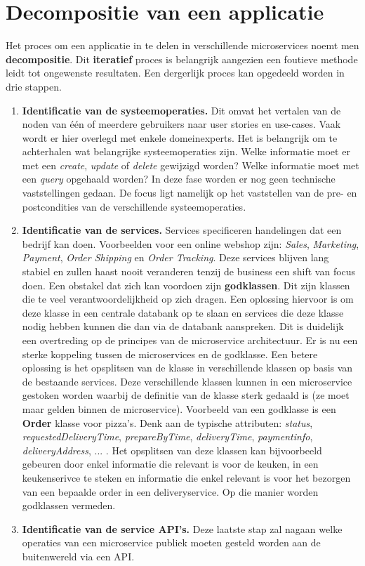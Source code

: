 \documentclass{report}
\begin{document}
	\chapter{Decompositie van een applicatie}
	Het proces om een applicatie in te delen in verschillende microservices noemt men \textbf{decompositie}. Dit \textbf{iteratief} proces is belangrijk aangezien een foutieve methode leidt tot ongewenste resultaten. Een dergerlijk proces kan opgedeeld worden in drie stappen.
	\begin{enumerate}
		\item \textbf{Identificatie van de systeemoperaties.} Dit omvat het vertalen van de noden van één of meerdere gebruikers naar user stories en use-cases. Vaak wordt er hier overlegd met enkele domeinexperts. Het is belangrijk om te achterhalen wat belangrijke systeemoperaties zijn. Welke informatie moet er met een \textit{create}, \textit{update} of \textit{delete} gewijzigd worden? Welke informatie moet met een \textit{query} opgehaald worden? In deze fase worden er nog geen technische vaststellingen gedaan. De focus ligt namelijk op het vaststellen van de pre- en postcondities van de verschillende systeemoperaties.
		
		\item \textbf{Identificatie van de services.} Services specificeren handelingen dat een bedrijf kan doen. Voorbeelden voor een online webshop zijn: \textit{Sales}, \textit{Marketing}, \textit{Payment}, \textit{Order Shipping} en \textit{Order Tracking}. Deze services blijven lang stabiel en zullen haast nooit veranderen tenzij de business een shift van focus doen. Een obstakel dat zich kan voordoen zijn \textbf{godklassen}. Dit zijn klassen die te veel verantwoordelijkheid op zich dragen. Een oplossing hiervoor is om deze klasse in een centrale databank op te slaan en services die deze klasse nodig hebben kunnen die dan via de databank aanspreken. Dit is duidelijk een overtreding op de principes van de microservice architectuur. Er is nu een sterke koppeling tussen de microservices en de godklasse. Een betere oplossing is het opsplitsen van de klasse in verschillende klassen op basis van de bestaande services. Deze verschillende klassen kunnen in een microservice gestoken worden waarbij de definitie van de klasse sterk gedaald is (ze moet maar gelden binnen de microservice). Voorbeeld van een godklasse is een \textbf{Order} klasse voor pizza's. Denk aan de typische attributen: \textit{status}, \textit{requestedDeliveryTime}, \textit{prepareByTime}, \textit{deliveryTime}, \textit{paymentinfo}, \textit{deliveryAddress}, ... . Het opsplitsen van deze klassen kan bijvoorbeeld gebeuren door enkel informatie die relevant is voor de keuken, in een keukenserivce te steken en informatie die enkel relevant is voor het bezorgen van een bepaalde order in een deliveryservice. Op die manier worden godklassen vermeden.
		
		\item \textbf{Identificatie van de service API's.} Deze laatste stap zal nagaan welke operaties van een microservice publiek moeten gesteld worden aan de buitenwereld via een API. 
	\end{enumerate}
\end{document}
